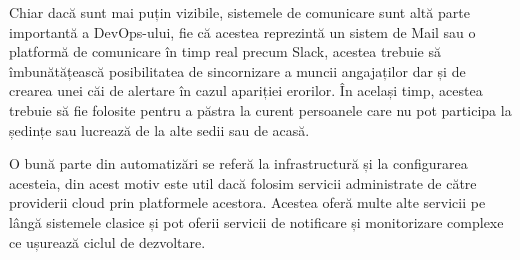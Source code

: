 Chiar dacă sunt mai puțin vizibile, sistemele de comunicare sunt altă parte importantă a
DevOps-ului, fie că acestea reprezintă un sistem de Mail sau o platformă de
comunicare în timp real precum Slack, acestea trebuie să îmbunătățească posibilitatea
de sincornizare a muncii angajaților dar și de crearea unei căi de alertare în cazul
apariției erorilor. În același timp, acestea trebuie să fie folosite pentru a păstra
la curent persoanele care nu pot participa la ședințe sau lucrează de la alte sedii sau de
acasă.

O bună parte din automatizări se referă la infrastructură și la configurarea
acesteia, din acest motiv este util dacă folosim servicii administrate
de către providerii cloud prin platformele acestora. Acestea oferă multe alte
servicii pe lângă sistemele clasice și pot oferii servicii de notificare și monitorizare complexe
ce ușurează ciclul de dezvoltare.
